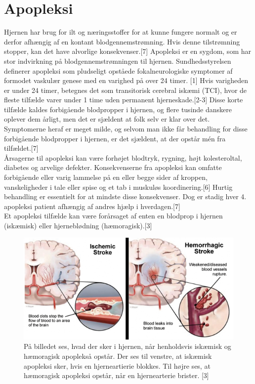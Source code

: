 \section{Apopleksi}
Hjernen har brug for ilt og næringsstoffer for at kunne fungere normalt og er derfor afhængig af en kontant blodgennemstrømning. Hvis denne tilstrømning stopper, kan det have alvorlige konsekvenser.[7] Apopleksi er en sygdom, som har stor indvirkning på blodgennemstrømningen til hjernen. Sundhedsstyrelsen definerer apopleksi som pludseligt opståede fokalneurologiske symptomer af formodet vaskulær genese med en varighed på over 24 timer. [1] Hvis varigheden er under 24 timer, betegnes det som transitorisk cerebral iskæmi (TCI), hvor de fleste tilfælde varer under 1 time uden permanent hjerneskade.[2-3] Disse korte tilfælde kaldes forbigående blodpropper i hjernen, og flere tusinde danskere oplever dem årligt, men det er sjældent at folk selv er klar over det. Symptomerne heraf er meget milde, og selvom man ikke får behandling for disse forbigående blodpropper i hjernen, er det sjældent, at der opstår mén fra tilfældet.[7] \\
Årsagerne til apopleksi kan være forhøjet blodtryk, rygning, højt kolesteroltal, diabetes og arvelige defekter. Konsekvenserne fra apopleksi kan omfatte forbigående eller varig lammelse på en eller begge sider af kroppen, vanskeligheder i tale eller spise og et tab i muskuløs koordinering.[6] Hurtig behandling er essentielt for at mindste disse konsekvenser. Dog er stadig hver 4. apopleksi patient afhængig af andres hjælp i hverdagen.[7] \\ %
Et apopleksi tilfælde kan være forårsaget af enten en blodprop i hjernen (iskæmisk) eller hjerneblødning (hæmoragisk).[3] 

\begin{figure}[H]
	\centering
	\includegraphics[scale=0.8]{figures/bProblemanalyse/haemoragisk_og_iskaemisk.png}
	\caption{På billedet ses, hvad der sker i hjernen, når henholdsvis iskæmisk og hæmoragisk apoplekså opstår. Der ses til venstre, at iskæmisk apopleksi sker, hvis en hjerneartierie blokkes. Til højre ses, at hæmoragisk apopleksi opstår, når en hjernearterie brister. [3]}
	\label{haem-isk}
\end{figure}

